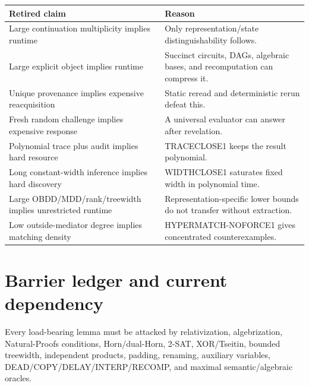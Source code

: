 \documentclass[11pt]{article}
\theoremstyle{plain}
\theoremstyle{definition}
\theoremstyle{remark}
\begin{document}
\begin{longtable}{p{} p{}}
\toprule
\textbf{Retired claim} & \textbf{Reason}\\
\midrule
\endhead
Large continuation multiplicity implies runtime &
Only representation/state distinguishability follows.\\
Large explicit object implies runtime &
Succinct circuits, DAGs, algebraic bases, and recomputation can compress it.\\
Unique provenance implies expensive reacquisition &
Static reread and deterministic rerun defeat this.\\
Fresh random challenge implies expensive response &
A universal evaluator can answer after revelation.\\
Polynomial trace plus audit implies hard resource &
TRACECLOSE1 keeps the result polynomial.\\
Long constant-width inference implies hard discovery &
WIDTHCLOSE1 saturates fixed width in polynomial time.\\
Large OBDD/MDD/rank/treewidth implies unrestricted runtime &
Representation-specific lower bounds do not transfer without extraction.\\
Low outside-mediator degree implies matching density &
HYPERMATCH-NOFORCE1 gives concentrated counterexamples.\\
\bottomrule
\end{longtable}

\section{Barrier ledger and current dependency}

Every load-bearing lemma must be attacked by relativization, algebrization,
Natural-Proofs conditions, Horn/dual-Horn, 2-SAT, XOR/Tseitin, bounded
treewidth, independent products, padding, renaming, auxiliary variables,
DEAD/COPY/DELAY/INTERP/RECOMP, and maximal semantic/algebraic oracles.
\end{document}
